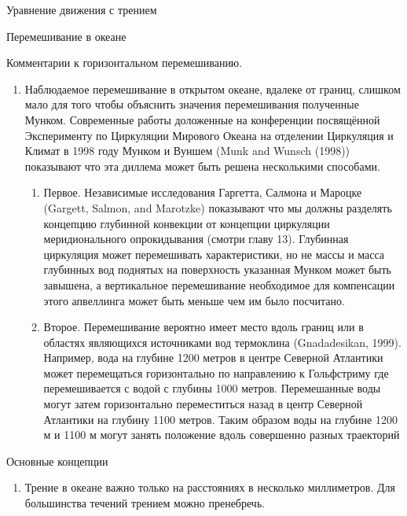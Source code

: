 \begin{chapter}{Уравнение движения с трением}
\begin{section}{Перемешивание в океане}
\begin{paragraph}{Комментарии к горизонтальном перемешиванию.}
\begin{enumerate}
\item
Наблюдаемое перемешивание в открытом океане, вдалеке от границ,
слишком мало для того чтобы объяснить значения перемешивания
полученные Мунком. Современные работы доложенные на конференции
посвящённой Эксперименту по Циркуляции Мирового Океана на отделении
Циркуляция и Климат в 1998 году Мунком и Вуншем (Munk and Wunsch
(1998)) показывают что эта диллема может быть решена несколькими
способами.
\begin{enumerate}
\item
Первое. Независимые исследования Гаргетта, Салмона и Мароцке (Gargett,
Salmon, and Marotzke) показывают что мы должны разделять концепцию
глубинной конвекции от концепции циркуляции меридионального
опрокидывания (смотри главу 13). Глубинная циркуляция может
перемешивать характеристики, но не массы и масса глубинных вод
поднятых на поверхность указанная Мунком может быть завышена, а
вертикальное перемешивание необходимое для компенсации этого
апвеллинга может быть меньше чем им было посчитано.

\item
Второе. Перемешивание вероятно имеет место вдоль границ или в областях
являющихся источниками вод термоклина (Gnadadesikan, 1999). Например,
вода на глубине 1200 метров в центре Северной Атлантики может
перемещаться горизонтально по направлению к Гольфстриму где
перемешивается с водой с глубины 1000 метров. Перемешанные воды могут
затем горизонтально переместиться назад в центр Северной Атлантики на
глубину 1100 метров. Таким образом воды на глубине 1200 м и 1100 м
могут занять положение вдоль совершенно разных траекторий
\end{enumerate}
\end{enumerate}
\end{paragraph}
\end{section}

\begin{section}{Основные концепции}
\begin{enumerate}
\item
Трение в океане важно только на расстояниях в несколько
миллиметров. Для большинства течений трением можно пренебречь.
%


\end{enumerate}
\end{section}
\end{chapter}
